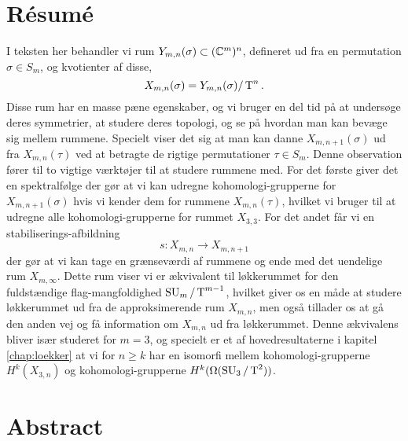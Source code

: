 


\chapter{Résumé} 


I teksten her behandler vi rum $Y_{m,n}(\sigma)\subset (\mathbb{C}^m)^n$,
defineret ud fra
en permutation $\sigma\in S_m$, og
kvotienter af disse,
\[ X_{m,n}(\sigma) = Y_{m,n}(\sigma) /\operatorname{T}^n. \]
Disse rum har en masse pæne egenskaber, og vi bruger en del tid på at
undersøge deres symmetrier, at studere deres topologi, og se på hvordan
man kan bevæge sig mellem
rummene. Specielt viser det sig at man kan danne $X_{m,n+1}(\sigma)$ ud
fra $X_{m,n}(\tau)$ ved at betragte de rigtige permutationer
$\tau\in S_m$. Denne observation fører til to vigtige værktøjer til at
studere rummene med. For det første giver det en spektralfølge der gør
at vi kan udregne
kohomologi-grupperne for $X_{m,n+1}(\sigma)$ hvis vi kender dem for
rummene $X_{m,n}(\tau)$, hvilket vi bruger til at udregne alle
kohomologi-grupperne for rummet $X_{3,3}$. For det andet får vi en
stabiliserings-afbildning
\[ s : X_{m,n} \to X_{m,n+1} \]
der gør at vi kan tage en grænseværdi af rummene og ende med det
uendelige rum $X_{m,\infty}$. Dette rum viser vi er ækvivalent til
løkkerummet for den fuldstændige flag-mangfoldighed $\operatorname{SU}_{m}/\operatorname{T}^{m-1}$, hvilket
giver os en måde at studere løkkerummet ud fra de approksimerende rum
$X_{m,n}$, men også tillader os at gå den anden vej og få information
om $X_{m,n}$ ud fra løkkerummet. Denne ækvivalens bliver især
studeret for $m = 3$, og specielt er et af hovedresultaterne i
kapitel \ref{chap:loekker} at vi for $n \geq k$ har en isomorfi mellem
kohomologi-grupperne $H^k(X_{3,n})$ og kohomologi-grupperne 
$H^k(\Omega(\operatorname{SU}_3/\operatorname{T}^2))$.

\chapter{Abstract}




